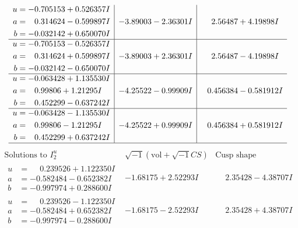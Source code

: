 \documentclass[1p]{elsarticle_modified}
\theoremstyle{definition}
\newcommand{\I}{\sqrt{-1}}
\begin{document}
$$\begin{array}{c|c|c}
\begin{aligned}
u &= -0.705153 + 0.526357 I \\
a &= \phantom{-}0.314624 - 0.599897 I \\
b &= -0.032142 + 0.650070 I\end{aligned}
 & -3.89003 - 2.36301 I & \phantom{-}2.56487 + 4.19898 I \\ \hline\begin{aligned}
u &= -0.705153 - 0.526357 I \\
a &= \phantom{-}0.314624 + 0.599897 I \\
b &= -0.032142 - 0.650070 I\end{aligned}
 & -3.89003 + 2.36301 I & \phantom{-}2.56487 - 4.19898 I \\ \hline\begin{aligned}
u &= -0.063428 + 1.135530 I \\
a &= \phantom{-}0.99806 + 1.21295 I \\
b &= \phantom{-}0.452299 - 0.637242 I\end{aligned}
 & -4.25522 - 0.99909 I & \phantom{-}0.456384 - 0.581912 I \\ \hline\begin{aligned}
u &= -0.063428 - 1.135530 I \\
a &= \phantom{-}0.99806 - 1.21295 I \\
b &= \phantom{-}0.452299 + 0.637242 I\end{aligned}
 & -4.25522 + 0.99909 I & \phantom{-}0.456384 + 0.581912 I\\
 \hline 
 \end{array}$$\newpage$$\begin{array}{c|c|c}  
\text{Solutions to }I^u_{2}& \I (\text{vol} + \sqrt{-1}CS) & \text{Cusp shape}\\
 \hline 
\begin{aligned}
u &= \phantom{-}0.239526 + 1.122350 I \\
a &= -0.582484 - 0.652382 I \\
b &= -0.997974 + 0.288600 I\end{aligned}
 & -1.68175 + 2.52293 I & \phantom{-}2.35428 - 4.38707 I \\ \hline\begin{aligned}
u &= \phantom{-}0.239526 - 1.122350 I \\
a &= -0.582484 + 0.652382 I \\
b &= -0.997974 - 0.288600 I\end{aligned}
 & -1.68175 - 2.52293 I & \phantom{-}2.35428 + 4.38707 I \\ \hline\begin{aligned}

\end{aligned}
\end{array}$$
\end{document}
